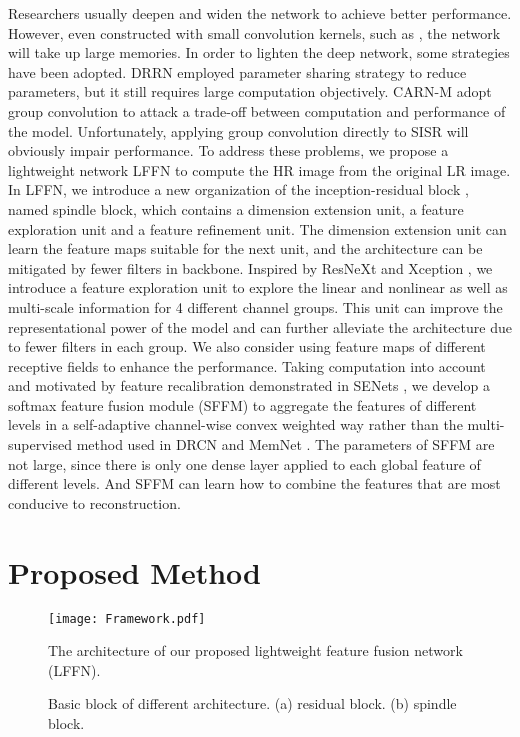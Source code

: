 \documentclass[journal]{IEEEtran}
\begin{document}
\par Researchers usually deepen and widen the network to achieve better performance. However, even constructed with small convolution kernels, such as , the network will take up large memories. In order to lighten the deep network, some strategies have been adopted. DRRN \cite{tai2017image} employed parameter sharing strategy to reduce parameters, but it still requires large computation objectively. CARN-M \cite{ahn2018fast} adopt group convolution to attack a trade-off between computation and performance of the model. Unfortunately, applying group convolution directly to SISR will obviously impair performance. To address these problems, we propose a lightweight network LFFN to compute the HR image from the original LR image. In LFFN, we introduce a new organization of the inception-residual block \cite{szegedy2017inception}, named spindle block, which contains a dimension extension unit, a feature exploration unit and a feature refinement unit. The dimension extension unit can learn the feature maps suitable for the next unit, and the architecture can be mitigated by fewer filters in backbone. Inspired by ResNeXt \cite{xie2017aggregated} and Xception \cite{chollet2017xception}, we introduce a feature exploration unit to explore the linear and nonlinear as well as multi-scale information for 4 different channel groups. This unit can improve the representational power of the model and can further alleviate the architecture due to fewer filters in each group. We also consider using feature maps of different receptive fields to enhance the performance. Taking computation into account and motivated by feature recalibration demonstrated in SENets \cite{hu2017squeeze}, we develop a softmax feature fusion module (SFFM) to aggregate the features of different levels in a self-adaptive channel-wise convex weighted way rather than the multi-supervised method used in DRCN\cite{kim2016deeply} and MemNet \cite{tai2017memnet}. The parameters of SFFM are not large, since there is only one dense layer applied to each global feature of different levels. And SFFM can learn how to combine the features that are most conducive to reconstruction.
\section{Proposed Method}

\begin{figure}[ht]
\centering
\texttt{[image: Framework.pdf]}
\caption{The architecture of our proposed lightweight feature fusion network (LFFN). }
\label{fig:framework}
\end{figure}
\begin{figure}[ht]
\centering
{}\centering
\caption{Basic block of different architecture. (a) residual block. (b) spindle block. }
\label{basic_block}
\end{figure}
\end{document}
